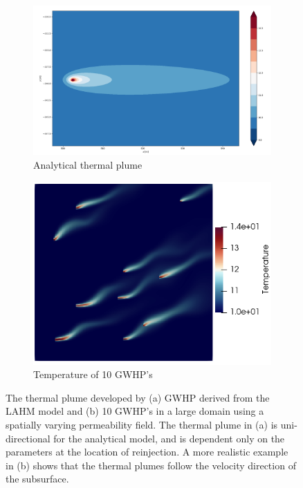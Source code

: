 \documentclass{article} %
\begin{document}
\begin{figure}
\centering
\begin{subfigure}{.5\textwidth}
  \centering
  \includegraphics[width=.8\linewidth]{analyticalPlume.png}
  \caption{Analytical thermal plume}
  \label{analyticalPlume}
\end{subfigure}%
\begin{subfigure}{.5\textwidth}
  \centering
  \includegraphics[width=.8\linewidth]{large_temp_example_2.png}
  \caption{Temperature of 10 GWHP's}
  \label{large_example}
\end{subfigure}
\caption{The thermal plume developed by (a) GWHP derived from the LAHM model and (b) 10 GWHP's in a large domain using a spatially varying permeability field. The thermal plume in (a) is uni-directional for the analytical model, and is dependent only on the parameters at the location of reinjection. A more realistic example in (b) shows that the thermal plumes follow the velocity direction of the subsurface.}
\label{fig:test}
\end{figure}

\end{document}
